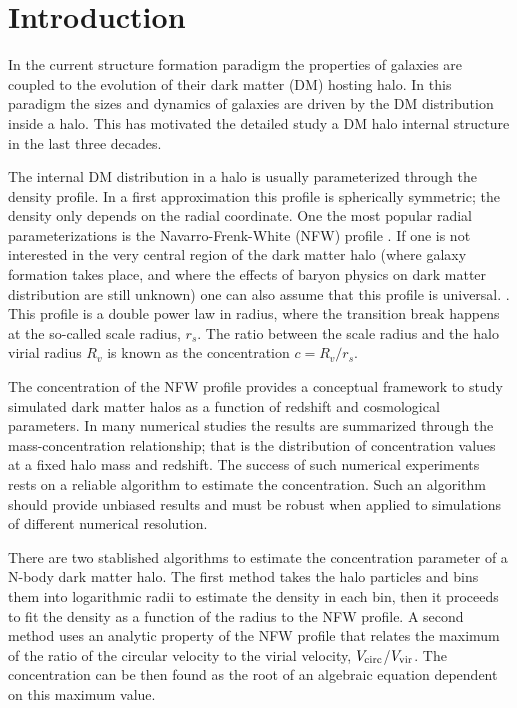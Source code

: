 \documentclass[a4,useAMS,usenatbib,usegraphicx]{mn2e}
\begin{document}
\section{Introduction}
\label{sec:introduction}
In the current structure formation paradigm the properties of galaxies
are coupled to the evolution of their dark matter (DM) hosting halo.
In this paradigm the sizes and dynamics of galaxies are driven by
the DM distribution inside a halo. This has motivated the detailed study
a DM halo internal structure in the last three decades. 

The internal DM distribution in a halo is usually parameterized
through the density profile.  
In a first approximation this profile is spherically symmetric; the
density only depends on the radial coordinate.  
One the most popular radial parameterizations is the
Navarro-Frenk-White (NFW) profile 
\citep{NFW}.   
If one is not interested in the very central region of the
dark matter halo (where galaxy formation takes place, and where the
effects of baryon physics on dark matter distribution are still 
unknown) one can also assume that this profile is universal.
\citep{Navarro2010}.  
 This profile is a double power law in radius, where the transition
break happens at the so-called scale radius, $r_s$.  
The ratio between the scale radius and the halo virial radius $R_v$ is
known as the concentration $c=R_v/r_s$. 


The concentration of the NFW profile provides a conceptual
framework to study simulated dark matter halos as a function of
redshift and cosmological parameters.
In many numerical studies 
\citep{Neto2007,Maccio2008,Duffy2008,Munoz2011,Prada2012,Ludlow2014} 
the results are summarized through the
mass-concentration relationship; that is the distribution of
concentration values at a fixed halo mass and redshift.
The success of such numerical experiments rests on a
reliable algorithm to estimate the concentration. 
Such an algorithm should provide unbiased results and must be robust
when applied to simulations of different numerical resolution.  

There are two stablished algorithms to estimate the concentration parameter
of a N-body dark matter halo. 
The first method takes the halo particles and bins them into
logarithmic radii to estimate the density in each bin, then it 
proceeds to fit the density as a function of the radius to the NFW
profile.  
A second method uses an analytic property of the NFW profile
that relates the maximum of the ratio of the circular velocity to the
virial velocity, $V_{\rm circ}$/$V_{\rm vir}$.  The concentration can
be then found as the root of an algebraic equation dependent on this
maximum value.  
\end{document}
